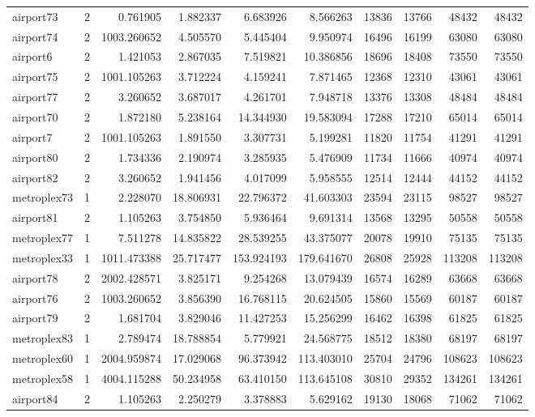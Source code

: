 \begin{longtable}{|l|r|r|r|r|r|r|r|r|r|}
airport73 & 2 & 0.761905 & 1.882337 & 6.683926 & 8.566263 & 13836 & 13766 & 48432 & 48432 \\
airport74 & 2 & 1003.260652 & 4.505570 & 5.445404 & 9.950974 & 16496 & 16199 & 63080 & 63080 \\
airport6 & 2 & 1.421053 & 2.867035 & 7.519821 & 10.386856 & 18696 & 18408 & 73550 & 73550 \\
airport75 & 2 & 1001.105263 & 3.712224 & 4.159241 & 7.871465 & 12368 & 12310 & 43061 & 43061 \\
airport77 & 2 & 3.260652 & 3.687017 & 4.261701 & 7.948718 & 13376 & 13308 & 48484 & 48484 \\
airport70 & 2 & 1.872180 & 5.238164 & 14.344930 & 19.583094 & 17288 & 17210 & 65014 & 65014 \\
airport7 & 2 & 1001.105263 & 1.891550 & 3.307731 & 5.199281 & 11820 & 11754 & 41291 & 41291 \\
airport80 & 2 & 1.734336 & 2.190974 & 3.285935 & 5.476909 & 11734 & 11666 & 40974 & 40974 \\
airport82 & 2 & 3.260652 & 1.941456 & 4.017099 & 5.958555 & 12514 & 12444 & 44152 & 44152 \\
metroplex73 & 1 & 2.228070 & 18.806931 & 22.796372 & 41.603303 & 23594 & 23115 & 98527 & 98527 \\
airport81 & 2 & 1.105263 & 3.754850 & 5.936464 & 9.691314 & 13568 & 13295 & 50558 & 50558 \\
metroplex77 & 1 & 7.511278 & 14.835822 & 28.539255 & 43.375077 & 20078 & 19910 & 75135 & 75135 \\
metroplex33 & 1 & 1011.473388 & 25.717477 & 153.924193 & 179.641670 & 26808 & 25928 & 113208 & 113208 \\
airport78 & 2 & 2002.428571 & 3.825171 & 9.254268 & 13.079439 & 16574 & 16289 & 63668 & 63668 \\
airport76 & 2 & 1003.260652 & 3.856390 & 16.768115 & 20.624505 & 15860 & 15569 & 60187 & 60187 \\
airport79 & 2 & 1.681704 & 3.829046 & 11.427253 & 15.256299 & 16462 & 16398 & 61825 & 61825 \\
metroplex83 & 1 & 2.789474 & 18.788854 & 5.779921 & 24.568775 & 18512 & 18380 & 68197 & 68197 \\
metroplex60 & 1 & 2004.959874 & 17.029068 & 96.373942 & 113.403010 & 25704 & 24796 & 108623 & 108623 \\
metroplex58 & 1 & 4004.115288 & 50.234958 & 63.410150 & 113.645108 & 30810 & 29352 & 134261 & 134261 \\
airport84 & 2 & 1.105263 & 2.250279 & 3.378883 & 5.629162 & 19130 & 18068 & 71062 & 71062 \\

\end{longtable}
